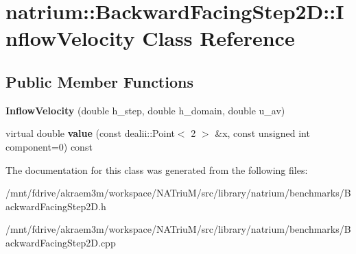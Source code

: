 \hypertarget{classnatrium_1_1BackwardFacingStep2D_1_1InflowVelocity}{
\section{natrium::BackwardFacingStep2D::InflowVelocity Class Reference}
\label{classnatrium_1_1BackwardFacingStep2D_1_1InflowVelocity}
}
\subsection*{Public Member Functions}
\begin{DoxyCompactItemize}
\item 
\hypertarget{classnatrium_1_1BackwardFacingStep2D_1_1InflowVelocity_a54c858d008ef221b77142f19501e7aa2}{
{\bfseries InflowVelocity} (double h\_\-step, double h\_\-domain, double u\_\-av)}
\label{classnatrium_1_1BackwardFacingStep2D_1_1InflowVelocity_a54c858d008ef221b77142f19501e7aa2}

\item 
\hypertarget{classnatrium_1_1BackwardFacingStep2D_1_1InflowVelocity_a57244206102dcc0a9913871b60f9a43e}{
virtual double {\bfseries value} (const dealii::Point$<$ 2 $>$ \&x, const unsigned int component=0) const }
\label{classnatrium_1_1BackwardFacingStep2D_1_1InflowVelocity_a57244206102dcc0a9913871b60f9a43e}

\end{DoxyCompactItemize}


The documentation for this class was generated from the following files:\begin{DoxyCompactItemize}
\item 
/mnt/fdrive/akraem3m/workspace/NATriuM/src/library/natrium/benchmarks/BackwardFacingStep2D.h\item 
/mnt/fdrive/akraem3m/workspace/NATriuM/src/library/natrium/benchmarks/BackwardFacingStep2D.cpp\end{DoxyCompactItemize}
